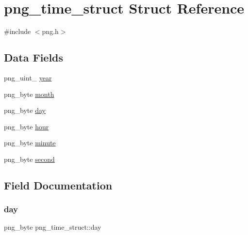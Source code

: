 \hypertarget{structpng__time__struct}{}\section{png\+\_\+time\+\_\+struct Struct Reference}
\label{structpng__time__struct}


{\ttfamily \#include $<$png.\+h$>$}

\subsection*{Data Fields}
\begin{DoxyCompactItemize}
\item 
png\+\_\+uint\+\_ \hyperlink{structpng__time__struct_a5cceb6213fc7b4462435ea1d8fc1c798}{year}
\item 
png\+\_\+byte \hyperlink{structpng__time__struct_a3ab550977ee2cb1165c0398131f2e601}{month}
\item 
png\+\_\+byte \hyperlink{structpng__time__struct_afa0f94516a676178d1dabeb96eccdcdb}{day}
\item 
png\+\_\+byte \hyperlink{structpng__time__struct_a79ac8b217254fd87cdc7299e6612a6f4}{hour}
\item 
png\+\_\+byte \hyperlink{structpng__time__struct_ad3ce11e9d92b77a33b3f7480bf0fff8c}{minute}
\item 
png\+\_\+byte \hyperlink{structpng__time__struct_a84e528e4c4c7d76cd2252e0d0d2ed0c9}{second}
\end{DoxyCompactItemize}


\subsection{Field Documentation}
\mbox{\label{structpng__time__struct_afa0f94516a676178d1dabeb96eccdcdb}} 
\subsubsection{\texorpdfstring{day}{day}}
{\footnotesize\ttfamily png\+\_\+byte png\+\_\+time\+\_\+struct\+::day}

\mbox{\label{structpng__time__struct_a79ac8b217254fd87cdc7299e6612a6f4}} 
